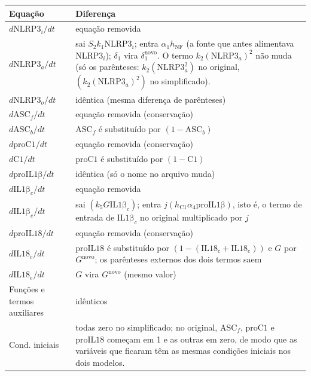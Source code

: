 \documentclass[11pt]{article}
\begin{document}
\begin{longtable}{p{2.6cm}p{11.9cm}}
\toprule
Equação & Diferença \\
\midrule
\endhead
$d\mathrm{NLRP3}_i/dt$ & equação removida \\
$d\mathrm{NLRP3}_a/dt$ & sai $S_2 k_1 \mathrm{NLRP3}_i$; entra $\alpha_1 h_{\mathrm{NF}}$ (a fonte
  que antes alimentava $\mathrm{NLRP3}_i$); $\delta_1$ vira $\delta_1^{\mathrm{novo}}$. O termo
  $k_2 (\mathrm{NLRP3}_a)^2$ não muda (só os parênteses: $k_2(\mathrm{NLRP3}_a^2)$ no original,
  $(k_2 (\mathrm{NLRP3}_a)^2)$ no simplificado). \\
$d\mathrm{NLRP3}_o/dt$ & idêntica (mesma diferença de parênteses) \\
$d\mathrm{ASC}_f/dt$ & equação removida (conservação) \\
$d\mathrm{ASC}_b/dt$ & $\mathrm{ASC}_f$ é substituído por $(1 - \mathrm{ASC}_b)$ \\
$d\mathrm{proC1}/dt$ & equação removida (conservação) \\
$d\mathrm{C1}/dt$ & $\mathrm{proC1}$ é substituído por $(1 - \mathrm{C1})$ \\
$d\mathrm{proIL1\beta}/dt$ & idêntica (só o nome no arquivo muda) \\
$d\mathrm{IL1\beta}_c/dt$ & equação removida \\
$d\mathrm{IL1\beta}_e/dt$ & sai $(k_5 G \mathrm{IL1\beta}_c)$; entra
  $j (h_{\mathrm{C1}} \alpha_4 \mathrm{proIL1\beta})$, isto é, o termo de entrada de
  $\mathrm{IL1\beta}_c$ no original multiplicado por $j$ \\
$d\mathrm{proIL18}/dt$ & equação removida (conservação) \\
$d\mathrm{IL18}_c/dt$ & $\mathrm{proIL18}$ é substituído por $(1 - (\mathrm{IL18}_c +
  \mathrm{IL18}_e))$ e $G$ por $G^{\mathrm{novo}}$; os parênteses externos dos dois termos
  saem \\
$d\mathrm{IL18}_e/dt$ & $G$ vira $G^{\mathrm{novo}}$ (mesmo valor) \\
\midrule
Funções e termos auxiliares & idênticos \\
Cond. iniciais & todas zero no simplificado; no original, $\mathrm{ASC}_f$, $\mathrm{proC1}$ e
  $\mathrm{proIL18}$ começam em 1 e as outras em zero, de modo que as variáveis que ficaram têm
  as mesmas condições iniciais nos dois modelos. \\
\bottomrule
\end{longtable}
\end{document}
